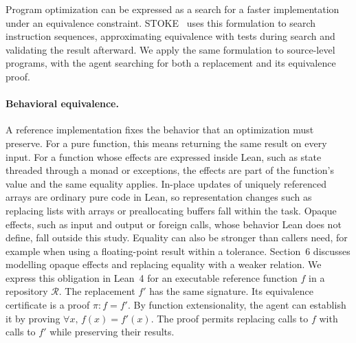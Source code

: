 \documentclass{article}
\begin{document}
Program optimization can be expressed as a search for a faster implementation under an equivalence constraint.
STOKE~\citep{schkufza2013stochastic} uses this formulation to search instruction sequences, approximating equivalence with tests during search and validating the result afterward.
We apply the same formulation to source-level programs, with the agent searching for both a replacement and its equivalence proof.

\paragraph{Behavioral equivalence.}
A reference implementation fixes the behavior that an optimization must preserve.
For a pure function, this means returning the same result on every input.
For a function whose effects are expressed inside Lean, such as state threaded through a monad or exceptions, the effects are part of the function's value and the same equality applies.
In-place updates of uniquely referenced arrays are ordinary pure code in Lean, so representation changes such as replacing lists with arrays or preallocating buffers fall within the task.
Opaque effects, such as input and output or foreign calls, whose behavior Lean does not define, fall outside this study.
Equality can also be stronger than callers need, for example when using a floating-point result within a tolerance.
Section~6 discusses modelling opaque effects and replacing equality with a weaker relation.
We express this obligation in Lean~4 for an executable reference function $f$ in a repository $\mathcal{R}$.
The replacement $f'$ has the same signature.
Its equivalence certificate is a proof $\pi : f = f'$.
By function extensionality, the agent can establish it by proving $\forall x,\, f(x)=f'(x)$.
The proof permits replacing calls to $f$ with calls to $f'$ while preserving their results.
\end{document}
